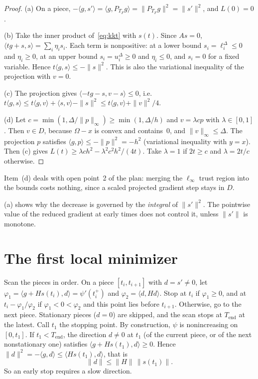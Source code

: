 \documentclass[11pt,a4paper]{article}
\numberwithin{equation}{section}
\theoremstyle{plain}
\theoremstyle{definition}
\theoremstyle{remark}
\newcommand{\inner}[2]{\langle #1,#2\rangle}
\newcommand{\Tend}{T_{\mathrm{end}}}
\begin{document}
\begin{proof}
(a) On a piece, $-\inner{g}{s'}=\inner{g}{P_{T_F}g}=\|P_{T_F}g\|^2=\|s'\|^2$, and $L(0)=0$.

(b) Take the inner product of~\eqref{eq:kkt} with $s(t)$. Since $As=0$,
$\inner{tg+s}{s}=\sum_i\eta_is_i$. Each term is nonpositive: at a lower bound
$s_i=\ell^\Delta_i\le0$ and $\eta_i\ge0$, at an upper bound $s_i=u^\Delta_i\ge0$ and
$\eta_i\le0$, and $s_i=0$ for a fixed variable. Hence $t\inner{g}{s}\le-\|s\|^2$. This is also
the variational inequality of the projection with $v=0$.

(c) The projection gives $\inner{-tg-s}{v-s}\le0$, i.e.
$t\inner{g}{s}\le t\inner{g}{v}+\inner{s}{v}-\|s\|^2\le t\inner{g}{v}+\|v\|^2/4$.

(d) Let $c=\min(1,\Delta/\|p\|_\infty)\ge\min(1,\Delta/h)$ and $v=\lambda cp$ with
$\lambda\in[0,1]$. Then $v\in D$, because $\Omega-x$ is convex and contains~0, and
$\|v\|_\infty\le\Delta$. The projection $p$ satisfies $\inner{g}{p}\le-\|p\|^2=-h^2$
(variational inequality with $y=x$). Then (c) gives
$L(t)\ge\lambda ch^2-\lambda^2c^2h^2/(4t)$. Take $\lambda=1$ if $2t\ge c$ and $\lambda=2t/c$
otherwise.
\end{proof}

Item~(d) deals with open point~2 of the plan: merging the $\ell_\infty$ trust region into the
bounds costs nothing, since a scaled projected gradient step stays in $D$.

(a) shows why the decrease is governed by the \emph{integral} of
$\|s'\|^2$. The pointwise value of the reduced gradient at early times does not control it,
unless $\|s'\|$ is monotone.

\section{The first local minimizer}\label{sec:first_local_min}

Scan the pieces in order. On a piece $[t_i,t_{i+1}]$ with $d=s'\ne0$, let
$\varphi_1=\inner{g+Hs(t_i)}{d}=\psi'(t_i^+)$ and $\varphi_2=\inner{d}{Hd}$. Stop at $t_i$ if
$\varphi_1\ge0$, and at $t_i-\varphi_1/\varphi_2$ if $\varphi_1<0<\varphi_2$ and this point lies
before $t_{i+1}$. Otherwise, go to the next piece. Stationary pieces ($d=0$) are skipped, and
the scan stops at $\Tend$ at the latest. Call $t_1$ the stopping point. By construction,
$\psi$ is nonincreasing on $[0,t_1]$. If $t_1<\Tend$, the direction $d\ne0$ at $t_1$ (of the
current piece, or of the next nonstationary one) satisfies $\inner{g+Hs(t_1)}{d}\ge0$. Hence
$\|d\|^2=-\inner{g}{d}\le\inner{Hs(t_1)}{d}$, that is
\begin{equation}\label{eq:slow}
  \|d\|\le\|H\|\,\|s(t_1)\|.
\end{equation}
So an early stop requires a slow direction.
\end{document}
